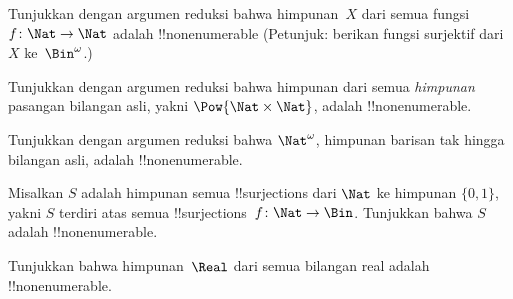\documentclass[../../../include/open-logic-section]{subfiles}
\begin{document}
\begin{prob}\label{sfr:siz:red-alt:prob:nat-nat}
  Tunjukkan dengan argumen reduksi bahwa himpunan~$X$ dari semua fungsi
  $f\colon \Nat \to \Nat$ adalah !!{nonenumerable} (Petunjuk: berikan fungsi
  surjektif dari $X$ ke~$\Bin^\omega$.)
\end{prob}

\begin{prob}
Tunjukkan dengan argumen reduksi bahwa himpunan dari semua \emph{himpunan}
pasangan bilangan asli, yakni $\Pow{\Nat \times \Nat}$, adalah
!!{nonenumerable}.
\end{prob}

\begin{prob}
Tunjukkan dengan argumen reduksi bahwa $\Nat^\omega$, himpunan barisan tak
hingga bilangan asli, adalah !!{nonenumerable}.
\end{prob}


\begin{prob}
Misalkan $S$ adalah himpunan semua !!{surjection}s dari $\Nat$ ke himpunan
$\{0,1\}$, yakni $S$ terdiri atas semua !!{surjection}s~$f \colon \Nat \to
\Bin$. Tunjukkan bahwa $S$ adalah !!{nonenumerable}.
\end{prob}

\begin{prob}
Tunjukkan bahwa himpunan~$\Real$ dari semua bilangan real adalah
!!{nonenumerable}.
\end{prob}
\end{document}

